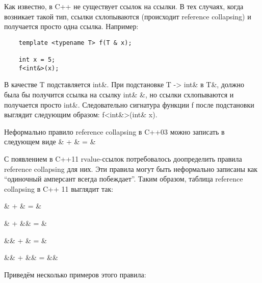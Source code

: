 	Как известно, в C++ не существует ссылок на ссылки. В тех случаях, когда возникает такой тип, ссылки схлопываются (происходит reference collapsing) и получается просто одна ссылка. Например:

	\begin{verbatim}
	template <typename T> f(T & x);

	int x = 5;
	f<int&>(x);
	\end{verbatim}

	В качестве T подставляется int\&. При подстановке T -> int\& в T\&,  должно была бы получится ссылка на ссылку int\& \&, но ссылки схлопываются и получается просто int\&. Следовательно сигнатура функции f после подстановки выглядит следующим образом: f<int\&>(int\& x).

	Неформально правило reference collapsing в C++03 можно записать в следующем виде \& + \& = \&

	С появлением в C++11 rvalue-ссылок потребовалось доопределить правила reference collapsing для них. Эти правила могут быть неформально записаны как “одиночный амперсант всегда побеждает”. Таким образом, таблица reference collapsing в C++ 11 выглядит так:

	\& + \& = \&

	\& + \&\& = \&

	\&\& + \& = \&

	\&\& + \&\& = \&\&

	Приведём несколько примеров этого правила:

